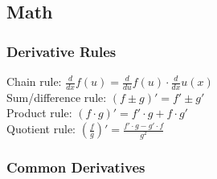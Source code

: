 \subsection{Math}
\subsubsection*{Derivative Rules}
Chain rule: $\frac{d}{dx} f(u) = \frac{d}{du} f(u) \cdot \frac{d}{dx} u(x)$\\
Sum/difference rule: $(f \pm g)' = f' \pm g'$\\
Product rule: $(f \cdot g)' = f' \cdot g + f \cdot g'$\\
Quotient rule: $(\frac{f}{g})' = \frac{f' \cdot g - g' \cdot f}{g^2}$\\
\subsubsection*{Common Derivatives}
 
 
